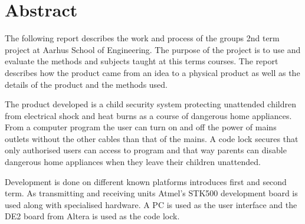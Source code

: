 \chapter*{Abstract}
The following report describes the work and process of the groups 2nd term project at Aarhus School of Engineering. The purpose of the project is to use and evaluate the methods and subjects taught at this terms courses. The report describes how the product came from an idea to a physical product as well as the details of the product and the methods used.

The product developed is a child security system protecting unattended children from electrical shock and heat burns as a course of dangerous home appliances. From a computer program the user can turn on and off the power of mains outlets without the other cables than that of the mains. A code lock secures that only authorised users can access to program and that way parents can disable dangerous home appliances when they leave their children unattended.

Development is done on different known platforms introduces first and second term. As transmitting and receiving units Atmel’s STK500 development board is used along with specialised hardware. A PC is used as the user interface and the DE2 board from Altera is used as the code lock.


